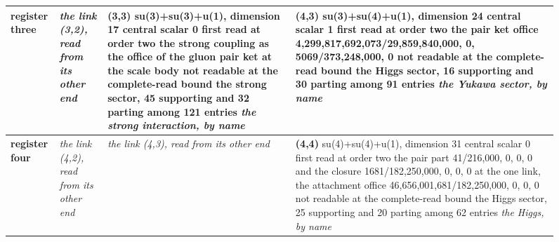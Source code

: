 \begin{figure}[htbp]
\begin{adjustbox}{max width=\linewidth}
\begin{tabular}{|p{14mm}|p{44mm}|p{44mm}|p{44mm}|}
\textbf{register three} & \emph{the link (3,2), read from its other end} & \textbf{(3,3)} \newline su(3)+su(3)+u(1), dimension 17 \newline central scalar 0 \newline first read at order two \newline the strong coupling as the office of the gluon pair ket at the scale body \newline not readable at the complete-read bound \newline the strong sector, 45 supporting and 32 parting among 121 entries \newline \emph{the strong interaction, by name} & \textbf{(4,3)} \newline su(3)+su(4)+u(1), dimension 24 \newline central scalar 1 \newline first read at order two \newline the pair ket office 4,299,817,692,073/29,859,840,000, 0, 5069/373,248,000, 0 \newline not readable at the complete-read bound \newline the Higgs sector, 16 supporting and 30 parting among 91 entries \newline \emph{the Yukawa sector, by name} \\ \hline
\textbf{register four} & \emph{the link (4,2), read from its other end} & \emph{the link (4,3), read from its other end} & \textbf{(4,4)} \newline su(4)+su(4)+u(1), dimension 31 \newline central scalar 0 \newline first read at order two \newline the pair part 41/216,000, 0, 0, 0 and the closure 1681/182,250,000, 0, 0, 0 at the one link, the attachment office 46,656,001,681/182,250,000, 0, 0, 0 \newline not readable at the complete-read bound \newline the Higgs sector, 25 supporting and 20 parting among 62 entries \newline \emph{the Higgs, by name} \\ \hline
\end{tabular}\end{adjustbox}

\end{figure}

